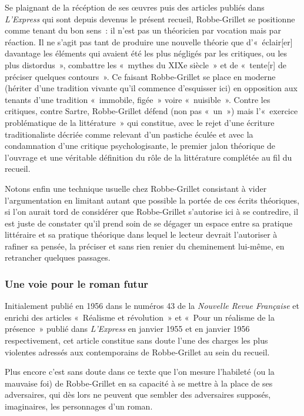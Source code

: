 \documentclass[12pt, a4paper]{article}
\begin{document}
Se plaignant de la récéption de ses œuvres puis des articles publiés dans \textit{L'Express} qui sont depuis devenus le présent recueil, Robbe-Grillet se positionne comme tenant du bon sens~: il n'est pas un théoricien par vocation mais par réaction. Il ne s'agit pas tant de produire une nouvelle théorie que d'«~éclair[er] davantage les éléments qui avaient été les plus négligés par les critiques, ou les plus distordus~», combattre les «~mythes du XIXe siècle~» et de «~tente[r] de préciser quelques contours~». Ce faisant Robbe-Grillet se place en moderne (hériter d'une tradition vivante qu'il commence d'esquisser ici) en opposition aux tenants d'une tradition «~immobile, figée~» voire «~nuisible~». Contre les critiques, contre Sartre, Robbe-Grillet défend (non pas «~un~») mais l'«~exercice problématique de la littérature~» qui constitue, avec le rejet d'une écriture traditionaliste décriée comme relevant d'un pastiche éculée et avec la condamnation d'une critique psychologisante, le premier jalon théorique de l'ouvrage et une véritable définition du rôle de la littérature complétée au fil du recueil.

Notons enfin une technique usuelle chez Robbe-Grillet consistant à vider l'argumentation en limitant autant que possible la portée de ces écrits théoriques, si l'on aurait tord de considérer que Robbe-Grillet s'autorise ici à se contredire, il est juste de constater qu'il prend soin de se dégager un espace entre sa pratique littéraire et sa pratique théorique dans lequel le lecteur devrait l'autoriser à rafiner sa pensée, la préciser et sans rien renier du cheminement lui-même, en retrancher quelques passages.


\subsubsection{Une voie pour le roman futur}
Initialement publié en 1956 dans le numéros 43 de la\textit{ Nouvelle Revue Française} et enrichi des articles «~Réalisme et révolution~» et «~Pour un réalisme de la présence~» publié dans \textit{L'Express} en janvier 1955 et en janvier 1956 respectivement, cet article constitue sans doute l'une des charges les plus violentes adressés aux contemporains de Robbe-Grillet au sein du recueil.

Plus encore c'est sans doute dans ce texte que l'on mesure l'habileté (ou la mauvaise foi) de Robbe-Grillet en sa capacité à se mettre à la place de ses adversaires, qui dès lors ne peuvent que sembler des adversaires supposés, imaginaires, les personnages d'un roman.
\end{document}
